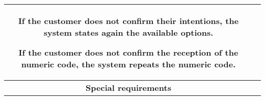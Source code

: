 \documentclass[../../main.tex]{subfiles}
\begin{document}
\begin{table}[H]
\begin{tabular}{c m{}}
                              If the customer does not confirm their intentions, the system states again the available options.
                              
                              If the customer does not confirm the reception of the numeric code, the system repeats the numeric code.\\ \hline
        \textbf{Special requirements} &\\ \hline
        \end{tabular}
    \end{table}
\end{document}
